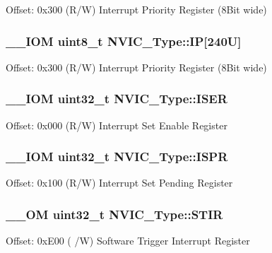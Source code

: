 Offset\-: 0x300 (R/\-W) Interrupt Priority Register (8\-Bit wide) \hypertarget{struct_n_v_i_c___type_a9a4341692e45d089a113986a3d344e98}{
\subsubsection[{I\-P}]{\setlength{\rightskip}{0pt plus 5cm}\-\_\-\-\_\-\-I\-O\-M uint8\-\_\-t N\-V\-I\-C\-\_\-\-Type\-::\-I\-P\mbox{[}240\-U\mbox{]}}}\label{struct_n_v_i_c___type_a9a4341692e45d089a113986a3d344e98}
Offset\-: 0x300 (R/\-W) Interrupt Priority Register (8\-Bit wide) \hypertarget{struct_n_v_i_c___type_ab1d578f3fd82d9d7ba937488721c57a3}{
\subsubsection[{I\-S\-E\-R}]{\setlength{\rightskip}{0pt plus 5cm}\-\_\-\-\_\-\-I\-O\-M uint32\-\_\-t N\-V\-I\-C\-\_\-\-Type\-::\-I\-S\-E\-R}}\label{struct_n_v_i_c___type_ab1d578f3fd82d9d7ba937488721c57a3}
Offset\-: 0x000 (R/\-W) Interrupt Set Enable Register \hypertarget{struct_n_v_i_c___type_a78a829d7fa59290031fedbc95af35825}{
\subsubsection[{I\-S\-P\-R}]{\setlength{\rightskip}{0pt plus 5cm}\-\_\-\-\_\-\-I\-O\-M uint32\-\_\-t N\-V\-I\-C\-\_\-\-Type\-::\-I\-S\-P\-R}}\label{struct_n_v_i_c___type_a78a829d7fa59290031fedbc95af35825}
Offset\-: 0x100 (R/\-W) Interrupt Set Pending Register \hypertarget{struct_n_v_i_c___type_a37de89637466e007171c6b135299bc75}{
\subsubsection[{S\-T\-I\-R}]{\setlength{\rightskip}{0pt plus 5cm}\-\_\-\-\_\-\-O\-M uint32\-\_\-t N\-V\-I\-C\-\_\-\-Type\-::\-S\-T\-I\-R}}\label{struct_n_v_i_c___type_a37de89637466e007171c6b135299bc75}
Offset\-: 0x\-E00 ( /\-W) Software Trigger Interrupt Register 

